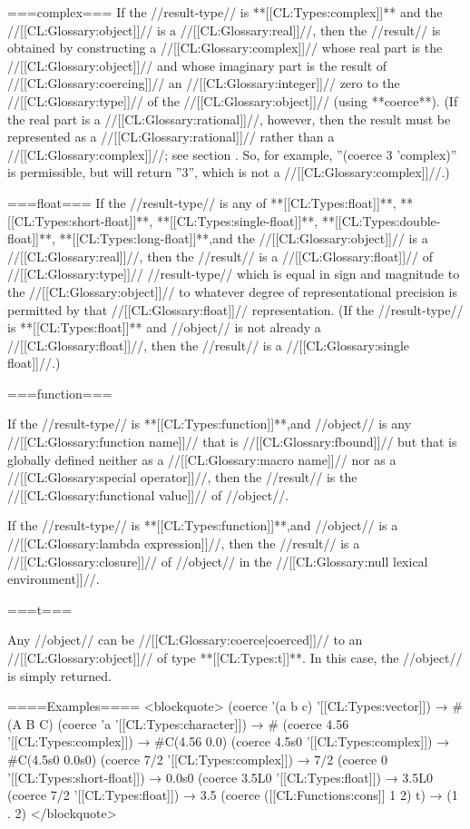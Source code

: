 ===complex===
If the //result-type// is **[[CL:Types:complex]]** and the //[[CL:Glossary:object]]// is a //[[CL:Glossary:real]]//, then the //result// is obtained by constructing a //[[CL:Glossary:complex]]// whose real part is the //[[CL:Glossary:object]]// and whose imaginary part is the result of //[[CL:Glossary:coercing]]// an //[[CL:Glossary:integer]]// zero to the //[[CL:Glossary:type]]// of the //[[CL:Glossary:object]]// (using **coerce**). (If the real part is a //[[CL:Glossary:rational]]//, however, then the result must be represented as a //[[CL:Glossary:rational]]// rather than a //[[CL:Glossary:complex]]//; see section {\secref\RuleOfCanonRepForComplexRationals}. So, for example, ''(coerce 3 'complex)'' is permissible, but will return ''3'', which is not a //[[CL:Glossary:complex]]//.)

===float===
If the //result-type// is any of **[[CL:Types:float]]**, **[[CL:Types:short-float]]**, **[[CL:Types:single-float]]**, **[[CL:Types:double-float]]**, **[[CL:Types:long-float]]**,and the //[[CL:Glossary:object]]// is a //[[CL:Glossary:real]]//, then the //result// is a //[[CL:Glossary:float]]// of //[[CL:Glossary:type]]// //result-type// which is equal in sign and magnitude to the //[[CL:Glossary:object]]// to whatever degree of representational precision is permitted by that //[[CL:Glossary:float]]// representation. (If the //result-type// is **[[CL:Types:float]]** and //object// is not already a //[[CL:Glossary:float]]//, then the //result// is a //[[CL:Glossary:single float]]//.)

===function===

If the //result-type// is **[[CL:Types:function]]**,and //object// is any //[[CL:Glossary:function name]]// that is //[[CL:Glossary:fbound]]// but that is globally defined neither as a //[[CL:Glossary:macro name]]// nor as a //[[CL:Glossary:special operator]]//, then the //result// is the //[[CL:Glossary:functional value]]// of //object//.

If the //result-type// is **[[CL:Types:function]]**,and //object// is a //[[CL:Glossary:lambda expression]]//, then the //result// is a //[[CL:Glossary:closure]]// of //object// in the //[[CL:Glossary:null lexical environment]]//.

===t===

Any //object// can be //[[CL:Glossary:coerce|coerced]]// to an //[[CL:Glossary:object]]// of type **[[CL:Types:t]]**. In this case, the //object// is simply returned.

====Examples====
<blockquote> 
(coerce '(a b c) '[[CL:Types:vector]]) → #(A B C) 
(coerce 'a '[[CL:Types:character]]) → #\A 
(coerce 4.56 '[[CL:Types:complex]]) → #C(4.56 0.0) 
(coerce 4.5s0 '[[CL:Types:complex]]) → #C(4.5s0 0.0s0) 
(coerce 7/2 '[[CL:Types:complex]]) → 7/2 
(coerce 0 '[[CL:Types:short-float]]) → 0.0s0 
(coerce 3.5L0 '[[CL:Types:float]]) → 3.5L0 
(coerce 7/2 '[[CL:Types:float]]) → 3.5 
(coerce ([[CL:Functions:cons]] 1 2) t) → (1 . 2) 
</blockquote>

